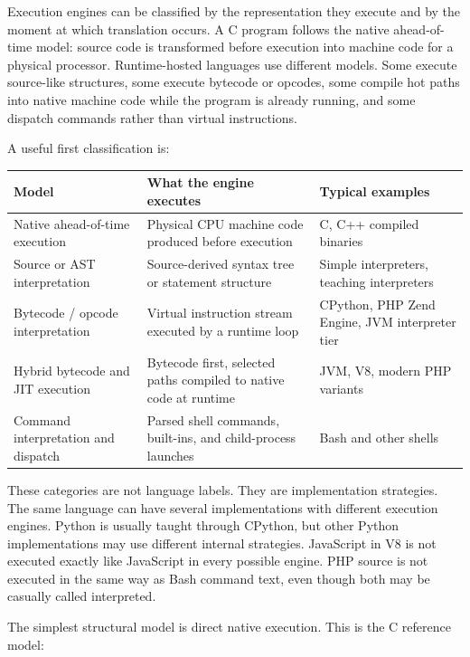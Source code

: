 Execution engines can be classified by the representation they execute and by the moment at which translation occurs. A C program follows the native ahead-of-time model: source code is transformed before execution into machine code for a physical processor. Runtime-hosted languages use different models. Some execute source-like structures, some execute bytecode or opcodes, some compile hot paths into native machine code while the program is already running, and some dispatch commands rather than virtual instructions.

A useful first classification is:

\begin{center}
\begin{tabular}{|p{}|p{}|p{}|}
\hline
\textbf{Model} & \textbf{What the engine executes} & \textbf{Typical examples} \\
\hline
Native ahead-of-time execution & Physical CPU machine code produced before execution & C, C++ compiled binaries \\
\hline
Source or AST interpretation & Source-derived syntax tree or statement structure & Simple interpreters, teaching interpreters \\
\hline
Bytecode / opcode interpretation & Virtual instruction stream executed by a runtime loop & CPython, PHP Zend Engine, JVM interpreter tier \\
\hline
Hybrid bytecode and JIT execution & Bytecode first, selected paths compiled to native code at runtime & JVM, V8, modern PHP variants \\
\hline
Command interpretation and dispatch & Parsed shell commands, built-ins, and child-process launches & Bash and other shells \\
\hline
\end{tabular}
\end{center}

These categories are not language labels. They are implementation strategies. The same language can have several implementations with different execution engines. Python is usually taught through CPython, but other Python implementations may use different internal strategies. JavaScript in V8 is not executed exactly like JavaScript in every possible engine. PHP source is not executed in the same way as Bash command text, even though both may be casually called interpreted.

The simplest structural model is direct native execution. This is the C reference model:

